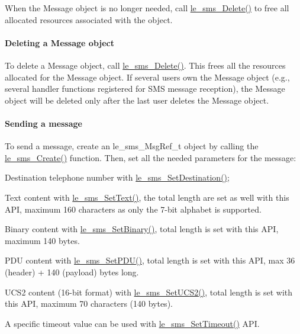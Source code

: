 When the Message object is no longer needed, call {\ttfamily \hyperlink{le__sms__interface_8h_aca1691010c88995cb47225f2889910fa}{le\+\_\+sms\+\_\+\+Delete()}} to free all allocated resources associated with the object.\hypertarget{c_sms_le_sms_ops_deleting_msg}{}\paragraph{Deleting a Message object}\label{c_sms_le_sms_ops_deleting_msg}
To delete a Message object, call \hyperlink{le__sms__interface_8h_aca1691010c88995cb47225f2889910fa}{le\+\_\+sms\+\_\+\+Delete()}. This frees all the resources allocated for the Message object. If several users own the Message object (e.\+g., several handler functions registered for S\+MS message reception), the Message object will be deleted only after the last user deletes the Message object.\hypertarget{c_sms_le_sms_ops_sending}{}\paragraph{Sending a message}\label{c_sms_le_sms_ops_sending}
To send a message, create an {\ttfamily le\+\_\+sms\+\_\+\+Msg\+Ref\+\_\+t} object by calling the {\ttfamily \hyperlink{le__sms__interface_8h_a668abcbcff2f1f3c5cdf799315a81058}{le\+\_\+sms\+\_\+\+Create()}} function. Then, set all the needed parameters for the message\+:
\begin{DoxyItemize}
\item Destination telephone number with \hyperlink{le__sms__interface_8h_a6fda3e193c9662c394412816ae508c23}{le\+\_\+sms\+\_\+\+Set\+Destination()};
\item Text content with \hyperlink{le__sms__interface_8h_aa5468a01069d8c8d03e5204453560d9a}{le\+\_\+sms\+\_\+\+Set\+Text()}, the total length are set as well with this A\+PI, maximum 160 characters as only the 7-\/bit alphabet is supported.
\item Binary content with \hyperlink{le__sms__interface_8h_ad135130755ab2979a265f65178a3ae0d}{le\+\_\+sms\+\_\+\+Set\+Binary()}, total length is set with this A\+PI, maximum 140 bytes.
\item P\+DU content with \hyperlink{le__sms__interface_8h_a0fc5c9da622cc48ef5f9d908dbcbbf92}{le\+\_\+sms\+\_\+\+Set\+P\+D\+U()}, total length is set with this A\+PI, max 36 (header) + 140 (payload) bytes long.
\item U\+C\+S2 content (16-\/bit format) with \hyperlink{le__sms__interface_8h_ac351541bd51f008551a55ea645e31599}{le\+\_\+sms\+\_\+\+Set\+U\+C\+S2()}, total length is set with this A\+PI, maximum 70 characters (140 bytes).
\item A specific timeout value can be used with \hyperlink{le__sms__interface_8h_a2b14febf0e2285b0b3c2dbcd1c2bb7b0}{le\+\_\+sms\+\_\+\+Set\+Timeout()} A\+PI.
\end{DoxyItemize}

